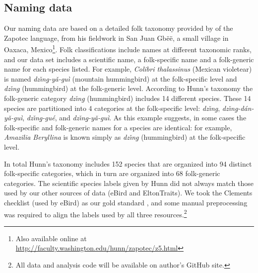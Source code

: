 \documentclass[10pt,letterpaper]{article}
\begin{document}
\subsection{Naming data}

Our naming data are based on a detailed folk taxonomy provided by  of the Zapotec language, from his fieldwork in San Juan Gb\"{e}\"{e}, a small village in Oaxaca, Mexico\footnote{ Also available online at \url{http://faculty.washington.edu/hunn/zapotec/z5.html}}. Folk classifications include names at different taxonomic ranks, and our data set includes a scientific name,  a folk-specific name and a folk-generic name for each species listed. For example, \emph{ Colibri thalassinus} (Mexican violetear) is named \textit{dz\v{\i}n\b{g}-y\v{a}-gu\`{i}} (mountain hummingbird) at the folk-specific level and \textit{dz\v{\i}n\b{g}} (hummingbird) at the folk-generic level.  According to Hunn's taxonomy the folk-generic category \textit{dz\v{\i}n\b{g}} (hummingbird) includes 14 different species. These 14 species are partitioned into 4 categories at the folk-specific level: \textit{dz\v{\i}n\b{g}}, \textit{dz\v{\i}n\b{g}-d\'{a}n-y\v{a}-gu\`{i}}, \textit{dz\v{\i}n\b{g}-gu\'{e}}, and \textit{dz\v{\i}n\b{g}-y\v{a}-gu\`{i}}.
As this example suggests, in some cases the folk-specific and folk-generic names for a species are identical: for example, 
 \emph{ Amazilia Beryllina} is known simply as \textit{dz\v{\i}n\b{g}} (hummingbird) at the folk-specific level.  %

In total Hunn's taxonomy includes 152 species that are organized into 94 distinct folk-specific categories, which in turn are organized into 68 folk-generic categories.  The scientific species labels given by Hunn  did not always match those used by our other sources of data (eBird and EltonTraits).  We took the Clements checklist (used by eBird) as our gold standard \cite{clements2007clements}, and some manual preprocessing was required to align the labels used by all three resources.\footnote{All data and analysis code will be available on author's GitHub site.}

\end{document}
